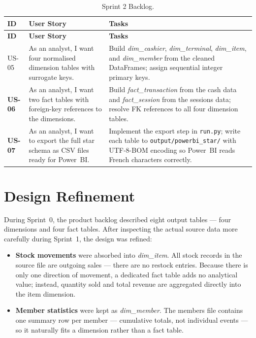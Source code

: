 \begin{longtable}{>{\bfseries}p{1.3cm} p{4.2cm} p{7cm}}
  \caption{Sprint 2 Backlog.\label{tab:sprint2_backlog}} \\
  \toprule
  \textbf{ID} & \textbf{User Story} & \textbf{Tasks} \\
  \midrule
  \endfirsthead
  \toprule
  \textbf{ID} & \textbf{User Story} & \textbf{Tasks} \\
  \midrule
  \endhead
  \bottomrule
  \endfoot

  US-05 & As an analyst, I want four normalised dimension tables with surrogate keys.
        & Build \textit{dim\_cashier}, \textit{dim\_terminal}, \textit{dim\_item},
          and \textit{dim\_member} from the cleaned DataFrames; assign sequential
          integer primary keys. \\[4pt]

  US-06 & As an analyst, I want two fact tables with foreign-key references to the
          dimensions.
        & Build \textit{fact\_transaction} from the cash data and
          \textit{fact\_session} from the sessions data; resolve FK references to
          all four dimension tables. \\[4pt]

  US-07 & As an analyst, I want to export the full star schema as CSV files ready
          for Power~BI.
        & Implement the export step in \texttt{run.py}; write each table to
          \texttt{output/powerbi\_star/} with UTF-8-BOM encoding so Power~BI
          reads French characters correctly. \\
\end{longtable}

\section{Design Refinement}

During Sprint~0, the product backlog described eight output tables — four dimensions
and four fact tables. After inspecting the actual source data more carefully during
Sprint~1, the design was refined:

\begin{itemize}
  \item \textbf{Stock movements} were absorbed into \textit{dim\_item}. All stock
        records in the source file are outgoing sales — there are no restock entries.
        Because there is only one direction of movement, a dedicated fact table adds
        no analytical value; instead, quantity sold and total revenue are aggregated
        directly into the item dimension.

  \item \textbf{Member statistics} were kept as \textit{dim\_member}. The members
        file contains one summary row per member — cumulative totals, not individual
        events — so it naturally fits a dimension rather than a fact table.
\end{itemize}

